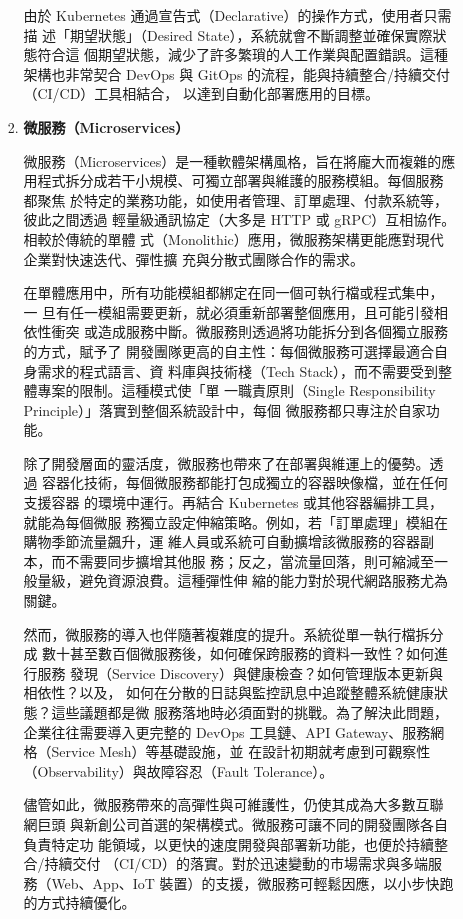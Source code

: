 \documentclass[12pt,a4paper]{article}
\begin{document}
\begin{enumerate}[label={(\zhdig*)}, leftmargin=2\parindent, listparindent=\parindent]
\begin{enumerate}[label={(\arabic*)}, leftmargin=\parindent, listparindent=\parindent]
\begin{enumerate}[label={(\zhdig*)}, leftmargin=2\parindent, listparindent=\parindent]
\begin{itemize}[leftmargin=\parindent, listparindent=\parindent]
\end{itemize}

由於 Kubernetes 通過宣告式（Declarative）的操作方式，使用者只需描
述「期望狀態」（Desired State），系統就會不斷調整並確保實際狀態符合這
個期望狀態，減少了許多繁瑣的人工作業與配置錯誤。這種架構也非常契合
DevOps 與 GitOps 的流程，能與持續整合/持續交付（CI/CD）工具相結合，
以達到自動化部署應用的目標。

\item\textbf{微服務（Microservices）\cite{10}}

微服務（Microservices）是一種軟體架構風格，旨在將龐大而複雜的應
用程式拆分成若干小規模、可獨立部署與維護的服務模組。每個服務都聚焦
於特定的業務功能，如使用者管理、訂單處理、付款系統等，彼此之間透過
輕量級通訊協定（大多是 HTTP 或 gRPC）互相協作。相較於傳統的單體
式（Monolithic）應用，微服務架構更能應對現代企業對快速迭代、彈性擴
充與分散式團隊合作的需求。

在單體應用中，所有功能模組都綁定在同一個可執行檔或程式集中，一
旦有任一模組需要更新，就必須重新部署整個應用，且可能引發相依性衝突
或造成服務中斷。微服務則透過將功能拆分到各個獨立服務的方式，賦予了
開發團隊更高的自主性：每個微服務可選擇最適合自身需求的程式語言、資
料庫與技術棧（Tech Stack），而不需要受到整體專案的限制。這種模式使「單
一職責原則（Single Responsibility Principle）」落實到整個系統設計中，每個
微服務都只專注於自家功能。

除了開發層面的靈活度，微服務也帶來了在部署與維運上的優勢。透過
容器化技術，每個微服務都能打包成獨立的容器映像檔，並在任何支援容器
的環境中運行。再結合 Kubernetes 或其他容器編排工具，就能為每個微服
務獨立設定伸縮策略。例如，若「訂單處理」模組在購物季節流量飆升，運
維人員或系統可自動擴增該微服務的容器副本，而不需要同步擴增其他服
務；反之，當流量回落，則可縮減至一般量級，避免資源浪費。這種彈性伸
縮的能力對於現代網路服務尤為關鍵。

然而，微服務的導入也伴隨著複雜度的提升。系統從單一執行檔拆分成
數十甚至數百個微服務後，如何確保跨服務的資料一致性？如何進行服務
發現（Service Discovery）與健康檢查？如何管理版本更新與相依性？以及，
如何在分散的日誌與監控訊息中追蹤整體系統健康狀態？這些議題都是微
服務落地時必須面對的挑戰。為了解決此問題，企業往往需要導入更完整的
DevOps 工具鏈、API Gateway、服務網格（Service Mesh）等基礎設施，並
在設計初期就考慮到可觀察性（Observability）與故障容忍（Fault Tolerance）。

儘管如此，微服務帶來的高彈性與可維護性，仍使其成為大多數互聯網巨頭
與新創公司首選的架構模式。微服務可讓不同的開發團隊各自負責特定功
能領域，以更快的速度開發與部署新功能，也便於持續整合/持續交付
（CI/CD）的落實。對於迅速變動的市場需求與多端服務（Web、App、IoT
裝置）的支援，微服務可輕鬆因應，以小步快跑的方式持續優化。


\end{enumerate}
\end{enumerate}
\end{enumerate}
\end{document}
